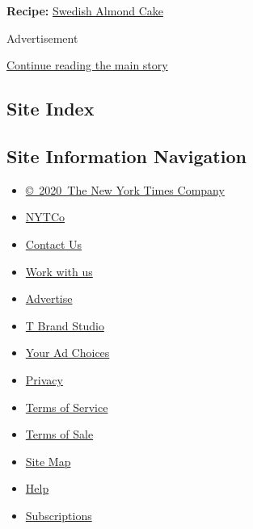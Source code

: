 \textbf{Recipe:}
\href{https://cooking.nytimes3xbfgragh.onion/recipes/1020767-swedish-almond-cake}{Swedish
Almond Cake}

Advertisement

\protect\hyperlink{after-bottom}{Continue reading the main story}

\hypertarget{site-index}{%
\subsection{Site Index}\label{site-index}}

\hypertarget{site-information-navigation}{%
\subsection{Site Information
Navigation}\label{site-information-navigation}}

\begin{itemize}
\tightlist
\item
  \href{https://help.nytimes3xbfgragh.onion/hc/en-us/articles/115014792127-Copyright-notice}{©~2020~The
  New York Times Company}
\end{itemize}

\begin{itemize}
\tightlist
\item
  \href{https://www.nytco.com/}{NYTCo}
\item
  \href{https://help.nytimes3xbfgragh.onion/hc/en-us/articles/115015385887-Contact-Us}{Contact
  Us}
\item
  \href{https://www.nytco.com/careers/}{Work with us}
\item
  \href{https://nytmediakit.com/}{Advertise}
\item
  \href{http://www.tbrandstudio.com/}{T Brand Studio}
\item
  \href{https://www.nytimes3xbfgragh.onion/privacy/cookie-policy\#how-do-i-manage-trackers}{Your
  Ad Choices}
\item
  \href{https://www.nytimes3xbfgragh.onion/privacy}{Privacy}
\item
  \href{https://help.nytimes3xbfgragh.onion/hc/en-us/articles/115014893428-Terms-of-service}{Terms
  of Service}
\item
  \href{https://help.nytimes3xbfgragh.onion/hc/en-us/articles/115014893968-Terms-of-sale}{Terms
  of Sale}
\item
  \href{https://spiderbites.nytimes3xbfgragh.onion}{Site Map}
\item
  \href{https://help.nytimes3xbfgragh.onion/hc/en-us}{Help}
\item
  \href{https://www.nytimes3xbfgragh.onion/subscription?campaignId=37WXW}{Subscriptions}
\end{itemize}
